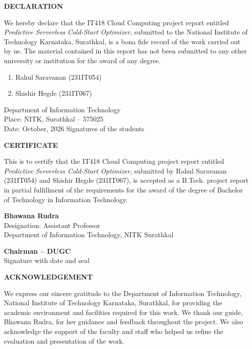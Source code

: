 \documentclass[12pt]{report}
\begin{document}
\clearpage
\thispagestyle{empty}
\begin{framed}
\begin{center}\textbf{\Large DECLARATION}\end{center}
\justifying
We hereby declare that the IT418 Cloud Computing project report entitled \textit{Predictive Serverless Cold-Start Optimizer}, submitted to the National Institute of Technology Karnataka, Surathkal, is a bona fide record of the work carried out by us. The material contained in this report has not been submitted to any other university or institution for the award of any degree.

\vspace{1em}
\begin{enumerate}[label={(\arabic*)}]
\item Rahul Saravanan (231IT054)
\item Shishir Hegde (231IT067)
\end{enumerate}

Department of Information Technology\\
Place: NITK, Surathkal -- 575025\\
Date: October, 2026
\vfill
\hfill Signatures of the students
\end{framed}

\clearpage
\thispagestyle{empty}
\begin{framed}
\begin{center}\textbf{\Large CERTIFICATE}\end{center}
\justifying
This is to certify that the IT418 Cloud Computing project report entitled \textit{Predictive Serverless Cold-Start Optimizer}, submitted by Rahul Saravanan (231IT054) and Shishir Hegde (231IT067), is accepted as a B.Tech. project report in partial fulfillment of the requirements for the award of the degree of Bachelor of Technology in Information Technology.

\vfill
\begin{center}
\textbf{Bhawana Rudra}\\
Designation: Assistant Professor\\
Department of Information Technology, NITK Surathkal

\vspace{2cm}
\textbf{Chairman -- DUGC}\\
Signature with date and seal
\end{center}
\end{framed}

\clearpage
\thispagestyle{empty}
\begin{center}\textbf{\Large ACKNOWLEDGEMENT}\end{center}
\justifying
We express our sincere gratitude to the Department of Information Technology, National Institute of Technology Karnataka, Surathkal, for providing the academic environment and facilities required for this work. We thank our guide, Bhawana Rudra, for her guidance and feedback throughout the project. We also acknowledge the support of the faculty and staff who helped us refine the evaluation and presentation of the work.
\end{document}
